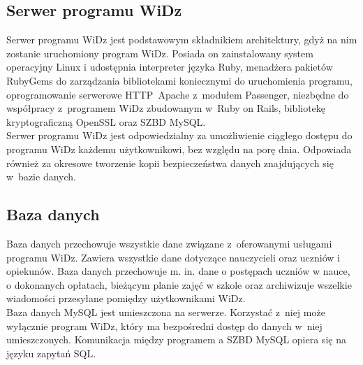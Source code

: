 \documentclass[12pt,leqno,twoside]{mwart}
\begin{document}
\subsection{Serwer programu WiDz}
\noindent Serwer programu WiDz jest podstawowym składnikiem architektury, gdyż na nim zostanie uruchomiony program WiDz. Posiada on zainstalowany system operacyjny Linux i udostępnia interpreter języka Ruby, menadżera pakietów RubyGems do zarządzania bibliotekami koniecznymi do uruchomienia programu, oprogramowanie serwerowe \hbox{HTTP Apache} z~modułem Passenger, niezbędne do współpracy z~programem WiDz zbudowanym w~Ruby on Rails, bibliotekę kryptograficzną OpenSSL oraz SZBD MySQL.\\
\indent Serwer programu WiDz jest odpowiedzialny za umożliwienie ciągłego dostępu do programu WiDz każdemu użytkownikowi, bez względu na porę dnia. Odpowiada również za okresowe tworzenie kopii bezpieczeństwa danych znajdujących się w~bazie danych. 

\subsection{Baza danych}
\noindent Baza danych przechowuje wszystkie dane związane z~oferowanymi usługami programu WiDz. Zawiera wszystkie dane dotyczące nauczycieli oraz uczniów i opiekunów. Baza danych przechowuje m. in. dane o postępach uczniów w nauce, o dokonanych opłatach, bieżącym planie zajęć w szkole oraz archiwizuje wszelkie wiadomości przesyłane pomiędzy użytkownikami WiDz.\\
\indent Baza danych  MySQL jest umieszczona na serwerze. Korzystać z~niej może wyłącznie program WiDz, który ma bezpośredni dostęp do danych w~niej umieszczonych. Komunikacja między programem a SZBD MySQL opiera się na języku zapytań SQL.
\end{document}
